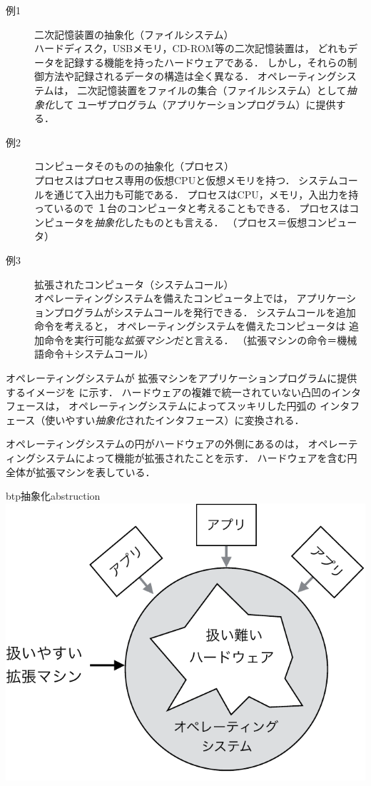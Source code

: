 \begin{description}
\item[例1] 二次記憶装置の抽象化（ファイルシステム） \\
  ハードディスク，USBメモリ，CD-ROM等の二次記憶装置は，
  どれもデータを記録する機能を持ったハードウェアである．
  しかし，それらの制御方法や記録されるデータの構造は全く異なる．
  オペレーティングシステムは，
  二次記憶装置をファイルの集合（ファイルシステム）として\emph{抽象化}して
  ユーザプログラム（アプリケーションプログラム）に提供する．

\item[例2] コンピュータそのものの抽象化（プロセス） \\
  プロセスはプロセス専用の仮想CPUと仮想メモリを持つ．
  システムコールを通じて入出力も可能である．
  プロセスはCPU，メモリ，入出力を持っているので
  １台のコンピュータと考えることもできる．
  プロセスはコンピュータを\emph{抽象化}したものとも言える．
  （プロセス＝仮想コンピュータ）

\item[例3] 拡張されたコンピュータ（システムコール） \\
  オペレーティングシステムを備えたコンピュータ上では，
  アプリケーションプログラムがシステムコールを発行できる．
  システムコールを追加命令を考えると，
  オペレーティングシステムを備えたコンピュータは
  追加命令を実行可能な\emph{拡張マシン}だと言える．
  （拡張マシンの命令＝機械語命令＋システムコール）
\end{description}

オペレーティングシステムが
拡張マシンをアプリケーションプログラムに提供するイメージを
に示す．
ハードウェアの複雑で統一されていない凸凹のインタフェースは，
オペレーティングシステムによってスッキリした円弧の
インタフェース（使いやすい\emph{抽象化}されたインタフェース）に変換される．

オペレーティングシステムの円がハードウェアの外側にあるのは，
オペレーティングシステムによって機能が拡張されたことを示す．
ハードウェアを含む円全体が拡張マシンを表している．

\begin{myfig}{btp}{抽象化}{abstruction}
  \includegraphics[scale=0.75]{Fig/abstruction-crop.pdf}
\end{myfig}

